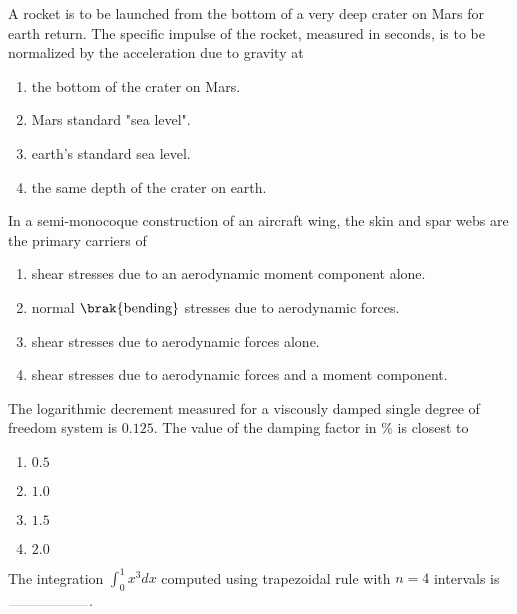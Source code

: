 \item A rocket is to be launched from the bottom of a very deep crater on Mars for earth return. The
specific impulse of the rocket, measured in seconds, is to be normalized by the acceleration due to
gravity at
\hfill{}
\begin{enumerate}
\item the bottom of the crater on Mars.
\item Mars standard "sea level".
\item earth's standard sea level.
\item the same depth of the crater on earth.
\end{enumerate}

\item In a semi-monocoque construction of an aircraft wing, the skin and spar webs are the primary
carriers of
\hfill{}
\begin{enumerate}
\item shear stresses due to an aerodynamic moment component alone.
\item normal $\brak{\text{bending}}$ stresses due to aerodynamic forces.
\item shear stresses due to aerodynamic forces alone.
\item shear stresses due to aerodynamic forces and a moment component.
\end{enumerate}

\item The logarithmic decrement measured for a viscously damped single degree of freedom system is $0.125$. The value of the damping factor in $\%$ is closest to
\hfill{}
\begin{enumerate}
\item $0.5$
\item $1.0$
\item $1.5$
\item $2.0$
\end{enumerate}

\item The integration $\int_{0}^{1}x^3 dx$ computed using trapezoidal rule with $n = 4$ intervals is $\rule{2cm}{0.1pt}$.
\hfill{}

